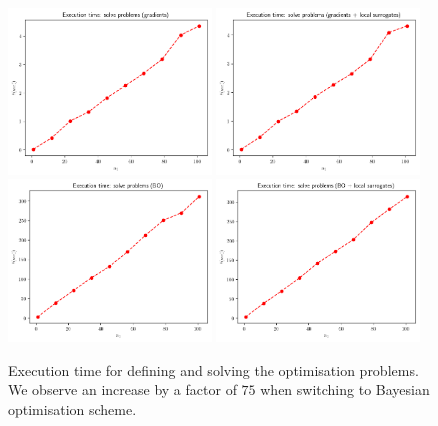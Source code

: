 \begin{figure}[h]
    \begin{center}
      \includegraphics[width=0.48\textwidth]{./Thesis/images/chapter4/exec_solve_grad.png}
      \includegraphics[width=0.48\textwidth]{./Thesis/images/chapter4/exec_solve_grad_fit.png}\\
      \includegraphics[width=0.48\textwidth]{./Thesis/images/chapter4/exec_solve_bo.png}
      \includegraphics[width=0.48\textwidth]{./Thesis/images/chapter4/exec_solve_bo_fit.png}          \end{center}
    \caption{Execution time for defining and solving the optimisation
      problems. We observe an increase by a factor of $75$ when switching
      to Bayesian optimisation scheme.}
  \label{fig:exec_solve}
\end{figure}



